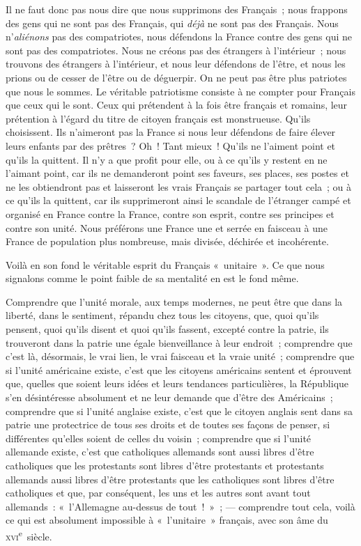 \documentclass[french,twoside]{book} %
\begin{document}
\noindent Il ne faut donc pas nous dire que nous supprimons des Français ; nous frappons des gens qui ne sont pas des Français, qui {\itshape déjà} ne sont pas des Français. Nous n’{\itshape aliénons} pas des compatriotes, nous défendons la France contre des gens qui ne  sont pas des compatriotes. Nous ne créons pas des étrangers à l’intérieur ; nous trouvons des étrangers à l’intérieur, et nous leur défendons de l’être, et nous les prions ou de cesser de l’être ou de déguerpir. On ne peut pas être plus patriotes que nous le sommes. Le véritable patriotisme consiste à ne compter pour Français que ceux qui le sont. Ceux qui prétendent à la fois être français et romains, leur prétention à l’égard du titre de citoyen français est monstrueuse. Qu’ils choisissent. Ils n’aimeront pas la France si nous leur défendons de faire élever leurs enfants par des prêtres ? Oh ! Tant mieux ! Qu’ils ne l’aiment point et qu’ils la quittent. Il n’y a que profit pour elle, ou à ce qu’ils y restent en ne l’aimant point, car ils ne demanderont point ses faveurs, ses places, ses postes et ne les obtiendront pas et laisseront les vrais Français se partager tout cela ; ou à ce qu’ils la quittent, car ils supprimeront ainsi le scandale de l’étranger campé et organisé en France contre la France, contre son esprit, contre ses principes et contre son unité. Nous préférons une France une et serrée en faisceau à une France de population plus nombreuse, mais divisée, déchirée et incohérente.\par
Voilà en son fond le véritable esprit du Français « unitaire ». Ce que nous signalons comme  le point faible de sa mentalité en est le fond même.\par
Comprendre que l’unité morale, aux temps modernes, ne peut être que dans la liberté, dans le sentiment, répandu chez tous les citoyens, que, quoi qu’ils pensent, quoi qu’ils disent et quoi qu’ils fassent, excepté contre la patrie, ils trouveront dans la patrie une égale bienveillance à leur endroit ; comprendre que c’est là, désormais, le vrai lien, le vrai faisceau et la vraie unité ; comprendre que si l’unité américaine existe, c’est que les citoyens américains sentent et éprouvent que, quelles que soient leurs idées et leurs tendances particulières, la République s’en désintéresse absolument et ne leur demande que d’être des Américains ; comprendre que si l’unité anglaise existe, c’est que le citoyen anglais sent dans sa patrie une protectrice de tous ses droits et de toutes ses façons de penser, si différentes qu’elles soient de celles du voisin ; comprendre que si l’unité allemande existe, c’est que catholiques allemands sont aussi libres d’être catholiques que les protestants sont libres d’être protestants et protestants allemands aussi libres d’être protestants que les catholiques sont libres d’être catholiques et que, par conséquent, les uns et les autres sont avant tout allemands : « l’Allemagne au-dessus  de tout ! » ; — comprendre tout cela, voilà ce qui est absolument impossible à « l’unitaire » français, avec son âme du \textsc{xvi}\textsuperscript{e} siècle.\par
\end{document}
